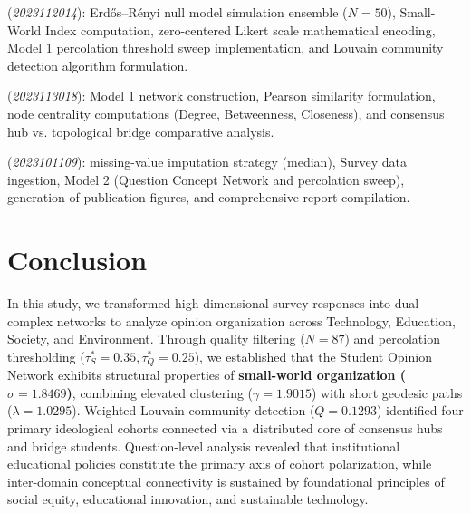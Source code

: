 \documentclass[10pt,twocolumn,a4paper]{article}
\begin{document}
\begin{description}[noitemsep,topsep=2pt,leftmargin=1.0em]
    \item[\textbf{Ampilli Sai Venkata Naga Bhargav}] (\textit{2023112014}): Erd\H{o}s--R\'enyi null model simulation ensemble ($N=50$), Small-World Index computation, zero-centered Likert scale mathematical encoding, Model 1 percolation threshold sweep implementation, and Louvain community detection algorithm formulation.
    \item[\textbf{Chaitanya Thogata}] (\textit{2023113018}): Model 1 network construction, Pearson similarity formulation, node centrality computations (Degree, Betweenness, Closeness), and consensus hub vs. topological bridge comparative analysis.
    \item[\textbf{Pasumarthy Deepak}] (\textit{2023101109}): missing-value imputation strategy (median), Survey data ingestion, Model 2 (Question Concept Network and percolation sweep), generation of publication figures, and comprehensive report compilation.
\end{description}

\section{Conclusion}
\label{sec:conclusion}

In this study, we transformed high-dimensional survey responses into dual complex networks to analyze opinion organization across Technology, Education, Society, and Environment. Through quality filtering ($N=87$) and percolation thresholding ($\tau^*_S = 0.35, \tau^*_Q = 0.25$), we established that the Student Opinion Network exhibits structural properties of \textbf{small-world organization ($\sigma = 1.8469$)}, combining elevated clustering ($\gamma = 1.9015$) with short geodesic paths ($\lambda = 1.0295$). Weighted Louvain community detection ($Q = 0.1293$) identified four primary ideological cohorts connected via a distributed core of consensus hubs and bridge students. Question-level analysis revealed that institutional educational policies constitute the primary axis of cohort polarization, while inter-domain conceptual connectivity is sustained by foundational principles of social equity, educational innovation, and sustainable technology.
\end{document}
